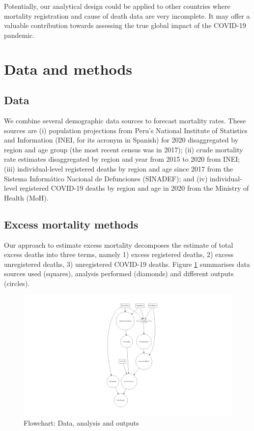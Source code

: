 \documentclass[
]{article}
\begin{document}
Potentially, our analytical design could be applied to other countries where mortality registration and cause of death data are very incomplete. It may offer a valuable contribution towards assessing the true global impact of the COVID-19 pandemic.

\hypertarget{data-and-methods}{%
\section{Data and methods}\label{data-and-methods}}

\hypertarget{data}{%
\subsection{Data}\label{data}}

We combine several demographic data sources to forecast mortality rates. These sources are (i) population projections from Peru's National Institute of Statistics and Information (INEI, for its acronym in Spanish) for 2020 disaggregated by region and age group (the most recent census was in 2017); (ii) crude mortality rate estimates disaggregated by region and year from 2015 to 2020 from INEI; (iii) individual-level registered deaths by region and age since 2017 from the Sistema Informático Nacional de Defunciones (SINADEF); and (iv) individual-level registered COVID-19 deaths by region and age in 2020 from the Ministry of Health (MoH).

\hypertarget{excess-mortality-methods}{%
\subsection{Excess mortality methods}\label{excess-mortality-methods}}

Our approach to estimate excess mortality decomposes the estimate of total excess deaths into three terms, namely 1) excess registered deaths, 2) excess unregistered deaths, 3) unregistered COVID-19 deaths. Figure \ref{fig:model} summarises data sources used (squares), analysis performed (diamonds) and different outputs (circles).

\begin{figure}
\centering
\includegraphics{article_files/figure-latex/model-1.png}
\caption{\label{fig:model}Flowchart: Data, analysis and outputs}
\end{figure}
\end{document}
